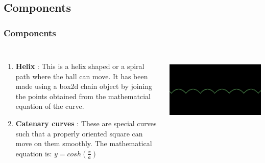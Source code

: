 \documentclass{beamer}
\begin{document}
\subsection{Components}
\begin{frame}
\frametitle{Components}
\begin{columns}
\begin{enumerate}
\item {} \textbf{Helix} : This is a helix shaped or a spiral path where the ball can move. It has been made using a box2d chain object by joining the points obtained from the mathematcial equation of the curve.
\item {} \textbf{Catenary curves} : These are special curves such that a properly oriented square can move on them smoothly. The mathematical equation is: 
$y = cosh(\frac{x}{a})$
\end{enumerate}
\\ 
\includegraphics[scale=0.15]{catenary2.png}
\end{columns}
\end{frame}
\end{document}

